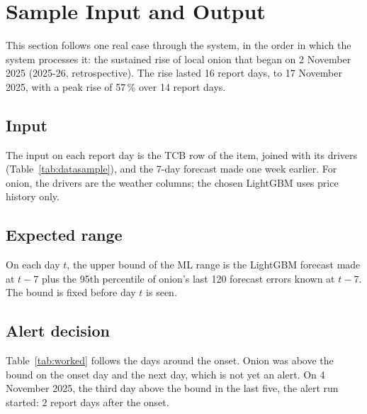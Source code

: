 \begin{table}[H]\centering\small
\caption[Coverage of the expected range]{Share of days at or below the upper bound, against the nominal 95\,\%, with Kupiec's test.}\label{tab:coverage}
\fittab{}
\end{table}

\section{Sample Input and Output}\label{sec:res-monitor}
This section follows one real case through the system, in the order in which the system processes it: the sustained rise of local onion that began on 2 November 2025 (2025-26, retrospective). The rise lasted 16 report days, to 17 November 2025, with a peak rise of 57\,\% over 14 report days.

\subsection{Input}
The input on each report day is the TCB row of the item, joined with its drivers (Table~\ref{tab:datasample}), and the 7-day forecast made one week earlier. For onion, the drivers are the weather columns; the chosen LightGBM uses price history only.

\subsection{Expected range}
On each day $t$, the upper bound of the ML range is the LightGBM forecast made at $t-7$ plus the 95th percentile of onion's last 120 forecast errors known at $t-7$. The bound is fixed before day $t$ is seen.

\subsection{Alert decision}
Table~\ref{tab:worked} follows the days around the onset. Onion was above the bound on the onset day and the next day, which is not yet an alert. On 4 November 2025, the third day above the bound in the last five, the alert run started: 2 report days after the onset.

\begin{table}[H]\centering\footnotesize
\caption[Worked example: onion, November 2025]{Worked example: local onion around the onset of the rise of 2 November 2025, under the ML range (prices in Tk; change over 7 report days).}\label{tab:worked}
\end{table}

